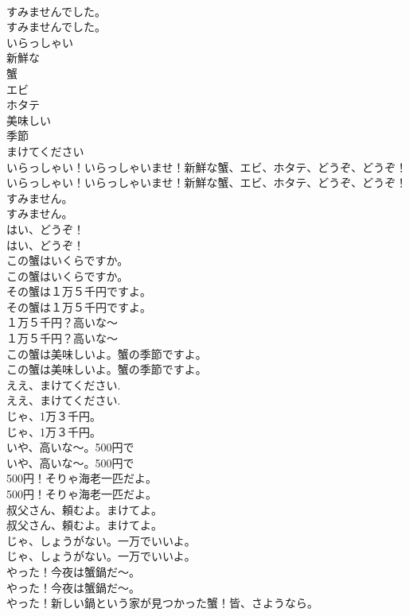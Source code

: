 \documentclass[8pt]{extreport}
\begin{document}
\begin{CJK}{UTF8}{min}
\\	すみませんでした。	
\\	すみませんでした。 
\\	いらっしゃい
\\	新鮮な
\\	蟹
\\	エビ
\\	ホタテ
\\	美味しい
\\	季節
\\	まけてください
\\	いらっしゃい！いらっしゃいませ！新鮮な蟹、エビ、ホタテ、どうぞ、どうぞ！	
\\	いらっしゃい！いらっしゃいませ！新鮮な蟹、エビ、ホタテ、どうぞ、どうぞ！ 
\\	すみません。	
\\	すみません。 
\\	はい、どうぞ！	
\\	はい、どうぞ！ 
\\	この蟹はいくらですか。	
\\	この蟹はいくらですか。 
\\	その蟹は１万５千円ですよ。	
\\	その蟹は１万５千円ですよ。 
\\	１万５千円？高いな〜	
\\	１万５千円？高いな〜 
\\	この蟹は美味しいよ。蟹の季節ですよ。	
\\	この蟹は美味しいよ。蟹の季節ですよ。 
\\	ええ、まけてください.	
\\	ええ、まけてください. 
\\	じゃ、1万３千円。	
\\	じゃ、1万３千円。 
\\	いや、高いな～。500円で	
\\	いや、高いな～。500円で 
\\	500円！そりゃ海老一匹だよ。	
\\	500円！そりゃ海老一匹だよ。 
\\	叔父さん、頼むよ。まけてよ。	
\\	叔父さん、頼むよ。まけてよ。 
\\	じゃ、しょうがない。一万でいいよ。	
\\	じゃ、しょうがない。一万でいいよ。 
\\	やった！今夜は蟹鍋だ～。	
\\	やった！今夜は蟹鍋だ～。 
\\	やった！新しい鍋という家が見つかった蟹！皆、さようなら。	

\end{CJK}
\end{document}
